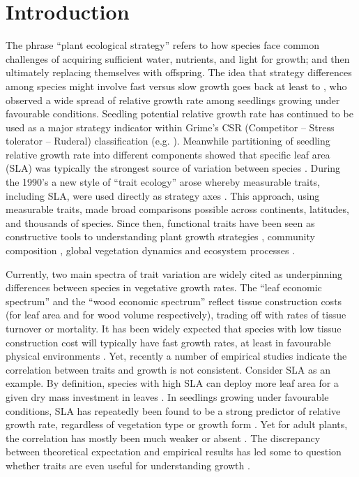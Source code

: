 \documentclass[a4paper,11pt]{article}
\begin{document}
\section*{Introduction}\label{introduction}

The phrase ``plant ecological strategy'' refers to how species face common challenges of acquiring sufficient water, nutrients, and light for growth; and then ultimately replacing themselves with offspring. The idea that strategy differences among species might involve fast versus slow growth goes back at least to \citet{Grime:1975gr}, who observed a wide spread of relative growth rate  among seedlings growing under favourable conditions. Seedling potential relative growth rate has continued to be used as a major strategy indicator within Grime's CSR (Competitor -- Stress tolerator -- Ruderal) classification (e.g. \citealt{grime1979plant, Grime:1997wm}). Meanwhile partitioning of seedling relative growth rate into different components showed that specific leaf area (SLA) was typically the strongest source of variation between species \citep{Poorter:1989tx, Rees:2010gk}. During the 1990's a new style of ``trait ecology'' arose whereby measurable traits, including SLA, were used directly as strategy axes \citep{Westoby:2002ft}. This approach, using measurable traits, made broad comparisons possible across continents, latitudes, and thousands of species. Since then, functional traits have been seen as constructive tools to understanding plant growth strategies \citep{Westoby:2002ft}, community composition \citep{Lavorel:2002ff,Shipley:2006ie}, global vegetation dynamics \citep{Scheiter:2013ed} and ecosystem processes \citep{Lavorel:2002ff}.

Currently, two main spectra of trait variation are widely cited as underpinning differences between species in vegetative growth rates. The ``leaf economic spectrum'' \citep{Wright:2004jb} and the ``wood economic spectrum'' \citep{Chave:2009iy} reflect tissue construction costs (for leaf area and for wood volume respectively), trading off with rates of tissue turnover or mortality. It has been widely expected that species with low tissue construction cost will typically have fast growth rates, at least in favourable physical environments \citep[e.g.][]{MullerLandau:2004dc,Poorter:2008iu,Chave:2009iy,Larjavaara:2010bn,Iida:2012jb,Paine:2015df}. Yet, recently a number of empirical studies indicate the correlation between traits and growth is not consistent. Consider SLA as an example. By definition, species with high SLA can deploy more leaf area for a given dry mass investment in leaves \citep{Poorter:1999wd, Reich:1992wm}. In seedlings growing under favourable conditions, SLA has repeatedly been found to be a strong predictor of relative growth rate, regardless of vegetation type or growth form \citep{Lambers:1992bj,Reich:1992wm,Grime:1997wm,Poorter:1999wd,Wright:1999ds}. Yet for adult plants, the correlation has mostly been much weaker or absent \citep{coomes_comparison_1998,Poorter:2008iu,Aiba:2009ft,Easdale:2009gv,Wright:2010tp}. The discrepancy between theoretical expectation and empirical results has led some to question whether traits are even useful for understanding growth \citep{Wright:2010tp, Paine:2015df}.
\end{document}
